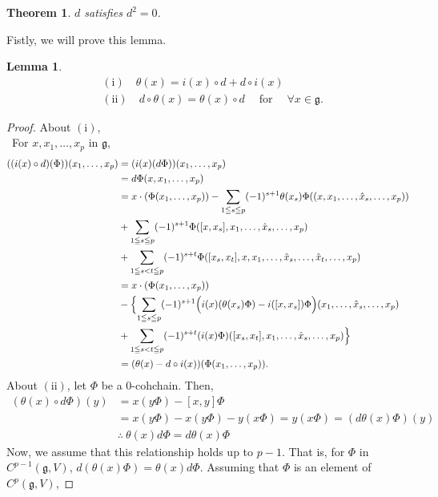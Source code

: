 \documentclass[titlepage,12pt]{article}
\newtheorem{lem}{Lemma}[section]
\newtheorem{thm}{Theorem}[section]
\newcommand{\g}{\mathfrak{g}}
\begin{document}
\begin{thm}
$d$ satisfies $d^{2}=0$.
\end{thm}
Fistly, we will prove this lemma.
\begin{lem} 
\begin{align*}
&\operatorname{(i)} \quad \theta(x) = i(x) \circ d + d \circ
i(x) \\
&\operatorname{(ii)} \quad d \circ \theta(x) = \theta(x) \circ d
\quad \operatorname{for} \quad \forall x \in \g.
\end{align*}
\end{lem}

\begin{proof}
About $\operatorname{(i)}$, \\
\ For $x,x_{1},\dots,x_{p}$ in $\g$,
\begin{align*}
((i(x) \circ d)(\Phi))(x_{1},\dots,x_{p}) &=
(i(x)(d\Phi))(x_{1},\dots,x_{p}) \\ &=
d\Phi(x,x_{1},\dots,x_{p}) \\
&= x \cdot (\Phi(x_{1},\dots,x_{p})) - \sum_{1 \leqq s \leqq
p}(-1)^{s+1}\theta(x_{s})\Phi((x,x_{1},\dots,\hat{x}_{s},\dots,x_{p}))\\
& + \sum_{1 \leqq s \leqq
p}(-1)^{s+1}\Phi([x,x_{s}],x_{1},\dots,\hat{x}_{s},\dots,x_{p})
\\
& + \sum_{1 \leqq s<t \leqq
p}(-1)^{s+t}\Phi([x_{s},x_{t}],x,x_{1},\dots,\hat{x}_{s},\dots,\hat{x}_{t},\dots,x_{p})
\\
	&= x \cdot (\Phi(x_{1},\dots,x_{p})) \\
& - \Bigl\{ \sum_{1 \leqq s \leqq
p}(-1)^{s+1}\Bigl(i(x)(\theta(x_{s})\Phi)-i([x,x_{s}])\Phi\Bigr)(x_{1},\dots,\hat{x}_{s},\dots,x_{p})
\\
& +\sum_{1 \leqq s<t \leqq p
}(-1)^{s+t}(i(x)\Phi)([x_{s},x_{t}],x_{1},\dots,\hat{x}_{s},\dots,x_{p})
\Bigr\} \\
&= (\theta(x)-d \circ i(x))(\Phi(x_{1},\dots,x_{p})).
\end{align*}
About $\operatorname{(ii)}$, let $\Phi$ be a 0-cohchain. Then,
\begin{align*}
(\theta(x) \circ d\Phi)(y)
	&= x(y\Phi)-[x,y]\Phi \\
	&= x(y\Phi)-{x(y\Phi)-y(x\Phi)} 
	= y(x\Phi) = (d\theta(x)\Phi)(y) \\
	&\therefore \  \theta(x)d\Phi=d\theta(x)\Phi
\end{align*}
Now, we assume that this relationship holds up to $p-1$. That is, for $\Phi$ in $C^{p-1}(\g,V)$,
$d(\theta(x)\Phi) = \theta(x)d\Phi$.
Assuming that $\Phi$ is an element of $C^{p}(\g,V)$,

\end{proof}
\end{document}
